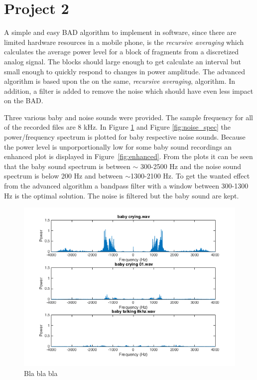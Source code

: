 \section{Project 2}
A simple and easy BAD algorithm to implement in software, since there are limited hardware resources
in a mobile phone, is the \emph{recursive averaging} which calculates the average power level for a
block of fragments from a discretized analog signal. The blocks should large enough to get calculate
an interval but small enough to quickly respond to changes in power amplitude. 
The advanced algorithm is based upon the on the same, \emph{recursive averaging}, algorithm.
In addition, a filter is added to remove the noise which should have even less impact on the BAD. 

Three various baby and noise sounds were provided. The sample frequency for all of the recorded 
files are 8 kHz. In Figure \ref{fig:baby_spec} and Figure \ref{fig:noise_spec} the power/frequency 
spectrum is plotted for baby respective noise sounds. Because the power level is unporportionally 
low for some baby sound recordings an enhanced plot is displayed in Figure~\ref{fig:enhanced}. 
From the plots it can be seen that the baby sound spectrum is between $\sim$ 300-2500 Hz and the 
noise sound spectrum is below 200 Hz and between $\sim$1300-2100 Hz. To get the wanted effect from 
the advanced algorithm a bandpass filter with a window between 300-1300 Hz is the optimal solution. 
The noise is filtered but the baby sound are kept.

\begin{figure}[h]
  \centering
  \includegraphics[width=1\textwidth]{sections/freq_spec_baby_linkaxis.png}
  \caption{Bla bla bla}
  \label{fig:baby_spec}
\end{figure}

